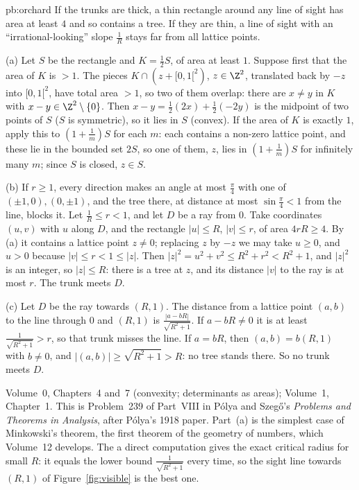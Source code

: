 \begin{solution}{pb:orchard}
\idea If the trunks are thick, a thin rectangle around any line of sight has area at least $4$ and so contains a tree. If they are
thin, a line of sight with an ``irrational-looking'' slope $\frac1R$ stays far from all lattice points.

\writeup (a) Let $S$ be the rectangle and $K=\frac12S$, of area at least $1$. Suppose first that the area of $K$ is $>1$. The pieces
$K\cap(z+[0,1[^2)$, $z\in\Z^2$, translated back by $-z$ into $[0,1[^2$, have total area $>1$, so two of them overlap: there are
$x\ne y$ in $K$ with $x-y\in\Z^2\setminus\{0\}$. Then $x-y=\frac12(2x)+\frac12(-2y)$ is the midpoint of two points of $S$ ($S$ is
symmetric), so it lies in $S$ (convex). If the area of $K$ is exactly $1$, apply this to $(1+\frac1m)S$ for each $m$: each contains
a non-zero lattice point, and these lie in the bounded set $2S$, so one of them, $z$, lies in $(1+\frac1m)S$ for infinitely many $m$;
since $S$ is closed, $z\in S$.

(b) If $r\ge1$, every direction makes an angle at most $\frac\pi4$ with one of $(\pm1,0),(0,\pm1)$, and the tree there, at distance
at most $\sin\frac\pi4<1$ from the line, blocks it. Let $\frac1R\le r<1$, and let $D$ be a ray from $0$. Take coordinates $(u,v)$ with
$u$ along $D$, and the rectangle $|u|\le R$, $|v|\le r$, of area $4rR\ge4$. By (a) it contains a lattice point $z\ne0$; replacing $z$ by
$-z$ we may take $u\ge0$, and $u>0$ because $|v|\le r<1\le|z|$. Then $|z|^2=u^2+v^2\le R^2+r^2<R^2+1$, and $|z|^2$ is an integer, so
$|z|\le R$: there is a tree at $z$, and its distance $|v|$ to the ray is at most $r$. The trunk meets $D$.

(c) Let $D$ be the ray towards $(R,1)$. The distance from a lattice point $(a,b)$ to the line through $0$ and $(R,1)$ is
$\frac{|a-bR|}{\sqrt{R^2+1}}$. If $a-bR\ne0$ it is at least $\frac1{\sqrt{R^2+1}}>r$, so that trunk misses the line. If $a=bR$, then
$(a,b)=b(R,1)$ with $b\ne0$, and $|(a,b)|\ge\sqrt{R^2+1}>R$: no tree stands there. So no trunk meets $D$.

\tools Volume~0, Chapters~4 and~7 (convexity; determinants as areas); Volume~1, Chapter~1.
\leads This is Problem~239 of Part~VIII in Pólya and Szegő's \emph{Problems and Theorems in Analysis}, after Pólya's 1918 paper.
Part~(a) is the simplest case of Minkowski's theorem, the first theorem of the geometry of numbers, which Volume~12 develops. The
a direct computation gives the exact critical radius for small $R$: it equals the lower bound $\frac1{\sqrt{R^2+1}}$ every time, so the sight
line towards $(R,1)$ of Figure~\ref{fig:visible} is the best one.
\end{solution}

